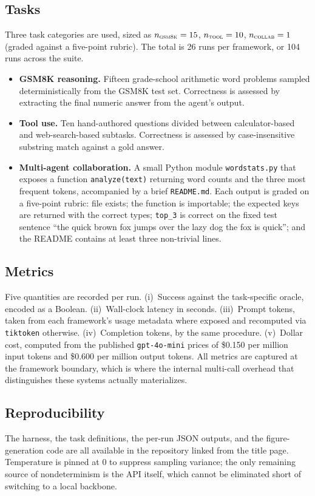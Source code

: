 \documentclass[conference]{IEEEtran}
\begin{document}
\subsection{Tasks}
Three task categories are used, sized as $n_{\textsc{gsm8k}}=15$,
$n_{\textsc{tool}}=10$, $n_{\textsc{collab}}=1$ (graded against a
five-point rubric). The total is 26 runs per framework, or 104 runs
across the suite.
\begin{itemize}[leftmargin=*]
\item \textbf{GSM8K reasoning.} Fifteen grade-school arithmetic word
problems sampled deterministically from the GSM8K test set.
Correctness is assessed by extracting the final numeric answer from
the agent's output.
\item \textbf{Tool use.} Ten hand-authored questions divided between
calculator-based and web-search-based subtasks. Correctness is
assessed by case-insensitive substring match against a gold answer.
\item \textbf{Multi-agent collaboration.} A small Python module
\texttt{wordstats.py} that exposes a function \texttt{analyze(text)}
returning word counts and the three most frequent tokens, accompanied
by a brief \texttt{README.md}. Each output is graded on a five-point
rubric: file exists; the function is importable; the expected keys
are returned with the correct types; \texttt{top\_3} is correct on
the fixed test sentence ``the quick brown fox jumps over the lazy
dog the fox is quick''; and the README contains at least three
non-trivial lines.
\end{itemize}

\subsection{Metrics}
Five quantities are recorded per run. (i)~Success against the
task-specific oracle, encoded as a Boolean. (ii)~Wall-clock latency in
seconds. (iii)~Prompt tokens, taken from each framework's usage
metadata where exposed and recomputed via \texttt{tiktoken} otherwise.
(iv)~Completion tokens, by the same procedure. (v)~Dollar cost,
computed from the published \texttt{gpt-4o-mini} prices of \$0.150
per million input tokens and \$0.600 per million output tokens. All
metrics are captured at the framework boundary, which is where the
internal multi-call overhead that distinguishes these systems
actually materializes.

\subsection{Reproducibility}
The harness, the task definitions, the per-run JSON outputs, and the
figure-generation code are all available in the repository linked
from the title page. Temperature is pinned at 0 to suppress sampling
variance; the only remaining source of nondeterminism is the API
itself, which cannot be eliminated short of switching to a local
backbone.
\end{document}

